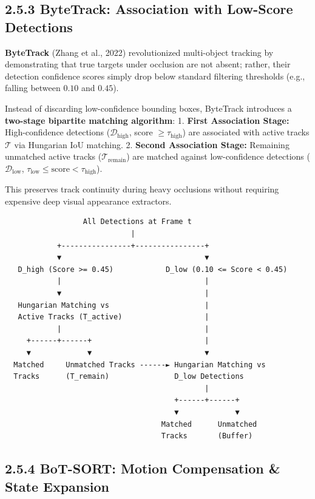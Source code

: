 \subsection{2.5.3 ByteTrack: Association with Low-Score
Detections}\label{bytetrack-association-with-low-score-detections}

\textbf{ByteTrack} (Zhang et al., 2022) revolutionized multi-object
tracking by demonstrating that true targets under occlusion are not
absent; rather, their detection confidence scores simply drop below
standard filtering thresholds (e.g., falling between \(0.10\) and
\(0.45\)).

Instead of discarding low-confidence bounding boxes, ByteTrack
introduces a \textbf{two-stage bipartite matching algorithm}: 1.
\textbf{First Association Stage:} High-confidence detections
(\(\mathcal{D}_{\text{high}}\), score \(\ge \tau_{\text{high}}\)) are
associated with active tracks \(\mathcal{T}\) via Hungarian IoU
matching. 2. \textbf{Second Association Stage:} Remaining unmatched
active tracks (\(\mathcal{T}_{\text{remain}}\)) are matched against
low-confidence detections (\(\mathcal{D}_{\text{low}}\),
\(\tau_{\text{low}} \le \text{score} < \tau_{\text{high}}\)).

This preserves track continuity during heavy occlusions without
requiring expensive deep visual appearance extractors.

\begin{verbatim}
                  All Detections at Frame t
                             |
            +----------------+----------------+
            ▼                                 ▼
   D_high (Score >= 0.45)            D_low (0.10 <= Score < 0.45)
            |                                 |
            ▼                                 |
   Hungarian Matching vs                      |
   Active Tracks (T_active)                   |
            |                                 |
     +------+------+                          |
     ▼             ▼                          ▼
  Matched     Unmatched Tracks ------► Hungarian Matching vs
  Tracks      (T_remain)               D_low Detections
                                              |
                                       +------+------+
                                       ▼             ▼
                                    Matched      Unmatched
                                    Tracks       (Buffer)
\end{verbatim}

\subsection{2.5.4 BoT-SORT: Motion Compensation \& State
Expansion}\label{bot-sort-motion-compensation-state-expansion}

